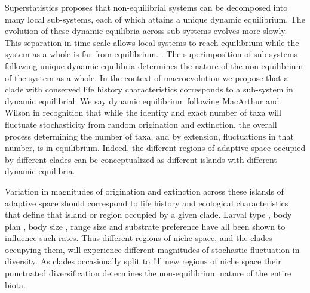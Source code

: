 \documentclass[12pt]{article}
\let\citep=\cite
\begin{document}
Superstatistics \citep{beck2003} proposes that non-equilibrial systems
can be decomposed into many local sub-systems, each of which attains a
unique dynamic equilibrium. The evolution of these dynamic equilibria
across sub-systems evolves more slowly. This separation in time scale
allows local systems to reach equilibrium while the system as a whole
is far from equilibrium.  \citep{beck2003}. The superimposition of
sub-systems following unique dynamic equilibria determines the nature
of the non-equilibrium of the system as a whole. In the context of
macroevolution we propose that a clade with conserved life history
characteristics corresponds to a sub-system in dynamic equilibrial.
We say dynamic equilibrium following MacArthur and Wilson
\citep{macWilson} in recognition that while the identity and exact
number of taxa will fluctuate stochasticity from random origination
and extinction, the overall process determining the number of taxa,
and by extension, fluctuations in that number, is in
equilibrium. Indeed, the different regions of adaptive space occupied
by different clades can be conceptualized as different islands with
different dynamic equilibria.

Variation in magnitudes of origination and extinction across these
islands of adaptive space should correspond to life history and
ecological characteristics that define that island or region occupied
by a given clade. Larval type \citep{jablonski2008}, body plan
\citep{erwin2012}, body size \citep{harnik2011}, range size
\citep{harnik2011, foote2008paleobiol} and substrate preference
\citep{hopkins2014} have all been shown to influence such rates. Thus
different regions of niche space, and the clades occupying them, will
experience different magnitudes of stochastic fluctuation in
diversity. As clades occasionally split to fill new regions of niche
space their punctuated diversification determines the non-equilibrium
nature of the entire biota.
\end{document}
